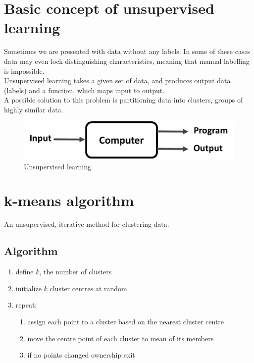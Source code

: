 \documentclass[a4paper,12pt,answers]{article}
\begin{document}
	
	
	\newpage
	\section{Basic concept of unsupervised learning}
	Sometimes we are presented with data without any labels. In some of these cases data may even lock distinguishing characteristics, meaning that manual labelling is impossible.
	\noindent
	\\[4pt]
	Unsupervised learning takes a given set of data, and produces output data (labels) and a function, which maps input to output.
	\noindent
	\\[4pt]
	A possible solution to this problem is partitioning data into clusters, groups of highly similar data.
	
	\begin{figure}[H]
		\centering
		\includegraphics[width=0.7\linewidth]{unsupervised_learning}
		\caption{Unsupervised learning}
		\label{fig:unsupervisedlearning}
	\end{figure}
	
	
	
	\section{k-means algorithm}
	An unsupervised, iterative method for clustering data.
	
	\subsection{Algorithm}
	\begin{enumerate}
		\item define $k$, the number of clusters
		\item initialize $k$ cluster centres at random
		\item repeat:
		\begin{enumerate}
			\item assign each point to a cluster based on the nearest cluster centre
			\item move the centre point of each cluster to mean of its members
			\item if no points changed ownership exit
		\end{enumerate}
	\end{enumerate}
	
\end{document}
